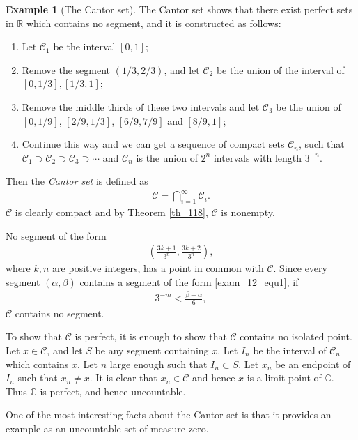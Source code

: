 \documentclass[11pt]{book}
\theoremstyle{definition}
\newtheorem{example}{Example}[chapter]
\numberwithin{equation}{chapter}
\begin{document}
\begin{example}[The Cantor set]
The Cantor set shows that there exist perfect sets in $\mathbb{R}$ which contains no segment, and it is constructed as follows:
\begin{enumerate}[label=(\roman*)]
    \item Let $\mathcal{C}_1$ be the interval $[0,1]$;
    
    \item Remove the segment $\left(1/3,2/3\right)$, and let $\mathcal{C}_2$ be the union of the interval of $\left[0,1/3\right],\left[1/3,1\right]$;
    
    \item Remove the middle thirds of these two intervals and let $\mathcal{C}_3$ be the union of $\left[0,1/9\right]$, $\left[2/9,1/3\right]$, $\left[6/9,7/9\right]$ and $\left[8/9,1\right]$;
    
    \item Continue this way and we can get a sequence of compact sets $\mathcal{C}_n$, such that $\mathcal{C}_1\supset \mathcal{C}_2\supset \mathcal{C}_3\supset\cdots$ and $\mathcal{C}_n$ is the union of $2^n$ intervals with length $3^{-n}$.
\end{enumerate}
Then the {\em Cantor set} is defined as 
\begin{align*}
    \mathcal{C} = \bigcap^\infty_{i=1}\mathcal{C}_i.
\end{align*}
$\mathcal{C}$ is clearly compact and by Theorem \ref{th_118}, $\mathcal{C}$ is nonempty.

No segment of the form
\begin{align}\label{exam_12_equ1}
    \left(\frac{3k+1}{3^n}, \frac{3k+2}{3^n}\right),
\end{align}
where $k,n$ are positive integers, has a point in common with $\mathcal{C}$. Since every segment $(\alpha, \beta)$ contains a segment of the form \eqref{exam_12_equ1}, if 
\begin{align*}
    3^{-m} < \frac{\beta - \alpha}{6},
\end{align*}
$\mathcal{C}$ contains no segment.

To show that $\mathcal{C}$ is perfect, it is enough to show that $\mathcal{C}$ contains no isolated point. Let $x \in \mathcal{C}$, and let $S$ be any segment containing $x$. Let $I_n$ be the interval of $\mathcal{C}_n$ which contains $x$. Let $n$ large enough such that $I_n \subset S$. Let $x_n$ be an endpoint of $I_n$ such that $x_n \neq x$. It is clear that $x_n \in \mathcal{C}$ and hence $x$ is a limit point of $\mathbb{C}$. Thus $\mathbb{C}$ is perfect, and hence uncountable. 

One of the most interesting facts about the Cantor set is that it provides an example as an uncountable set of measure zero.
\end{example}
\end{document}
